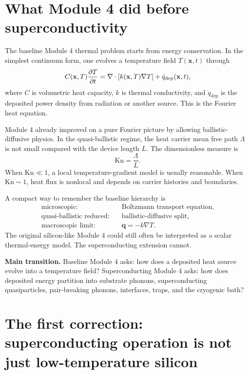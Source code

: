 \documentclass[11pt]{article}
\newcommand{\qdep}{\dot q_{\mathrm{dep}}}
\renewcommand{\mfp}{\Lambda}
\newcommand{\Kn}{\mathrm{Kn}}
\newcommand{\x}{\mathbf{x}}
\newcommand{\Jq}{\mathbf{q}}
\begin{document}
\section{What Module 4 did before superconductivity}

The baseline Module 4 thermal problem starts from energy conservation. In the simplest continuum form, one evolves a temperature field \(T(\x,t)\) through
\begin{equation}
C(\x,T)\pdv{T}{t}=\nabla\cdot\left[k(\x,T)\nabla T\right]+\qdep(\x,t),
\label{eq:baseline_fourier}
\end{equation}
where \(C\) is volumetric heat capacity, \(k\) is thermal conductivity, and \(\qdep\) is the deposited power density from radiation or another source. This is the Fourier heat equation.

Module 4 already improved on a pure Fourier picture by allowing ballistic-diffusive physics. In the quasi-ballistic regime, the heat carrier mean free path \(\mfp\) is not small compared with the device length \(L\). The dimensionless measure is
\begin{equation}
\Kn=\frac{\mfp}{L}.
\end{equation}
When \(\Kn\ll 1\), a local temperature-gradient model is usually reasonable. When \(\Kn\sim 1\), heat flux is nonlocal and depends on carrier histories and boundaries.

A compact way to remember the baseline hierarchy is
\begin{align}
\text{microscopic:} \quad & \text{Boltzmann transport equation},\\
\text{quasi-ballistic reduced:} \quad & \text{ballistic-diffusive split},\\
\text{macroscopic limit:} \quad & \Jq=-k\nabla T. 
\end{align}
The original silicon-like Module 4 could still often be interpreted as a scalar thermal-energy model. The superconducting extension cannot.

\begin{physicsbox}
\textbf{Main transition.} Baseline Module 4 asks: how does a deposited heat source evolve into a temperature field? Superconducting Module 4 asks: how does deposited energy partition into substrate phonons, superconducting quasiparticles, pair-breaking phonons, interfaces, traps, and the cryogenic bath?
\end{physicsbox}

\section{The first correction: superconducting operation is not just low-temperature silicon}
\end{document}
